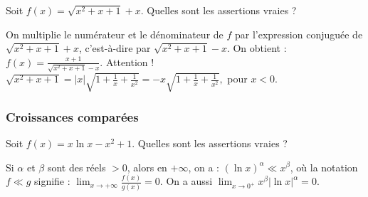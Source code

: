 \begin{question}

Soit $f(x)= \sqrt{x^2+x+1}+x$. Quelles sont les assertions vraies ?
\begin{answers}
    


\end{answers}
\begin{explanations}
On multiplie le numérateur et le dénominateur de $f$ par l'expression conjuguée de $\sqrt{x^2+x+1}+x$, c'est-à-dire par  $\sqrt{x^2+x+1}-x$. On obtient : 
$f(x)= \frac{x+1}{\sqrt {x^2+x+1}-x}$. Attention !  $\sqrt {x^2+x+1}=|x|\sqrt {1+\frac{1}{x}+ \frac{1}{x^2}}= -x\sqrt {1+\frac{1}{x}+ \frac{1}{x^2}}, $ pour $x<0$.
\end{explanations}

\end{question}



\subsubsection{Croissances comparées}

\begin{question}
 
Soit $f(x)= x\ln x -x^2+1$. Quelles sont les assertions vraies ?
\begin{answers}



\end{answers}
\begin{explanations}
Si $\alpha$ et $ \beta$ sont des réels $>0$, alors  en $+\infty$, on a :
$(\ln x)^{\alpha} \ll x^{\beta}$, où la notation $f\ll g$ signifie : $\lim_{x \to + \infty} \frac{f(x)}{g(x)}=0. $  
On a aussi  $\lim_{x\to 0^+} x^{\beta} |\ln x|^{\alpha} = 0$.
\end{explanations}

\end{question}


